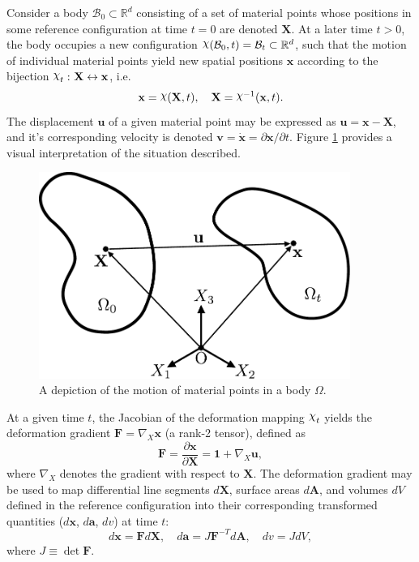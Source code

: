 Consider a body $\mathcal{B}_0 \subset \mathbb{R}^d$ consisting of a set of material points whose positions in some reference configuration at time $t = 0$ are denoted $\mathbf{X}$. At a later time $t > 0$, the body occupies a new configuration $\raisebox{\depth}{$\chi$} (\mathcal{B}_0, t) = \mathcal{B}_t \subset \mathbb{R}^d$, such that the motion of individual material points yield new spatial positions $\mathbf{x}$ according to the bijection $\raisebox{\depth}{$\chi$}_t \, \colon \mathbf{X} \leftrightarrow \mathbf{x}$, i.e.
\begin{equation}
  \mathbf{x} = \raisebox{\depth}{$\chi$} (\mathbf{X}, t), \quad \mathbf{X} = \raisebox{\depth}{$\chi$}^{-1} (\mathbf{x}, t).
\end{equation}
The displacement $\mathbf{u}$ of a given material point may be expressed as $\mathbf{u} = \mathbf{x} - \mathbf{X}$, and it's corresponding velocity is denoted $\mathbf{v} = \dot{\mathbf{x}} = \partial \mathbf{x} / \partial t$. Figure \ref{fig:kinematics} provides a visual interpretation of the situation described.
\begin{figure}[!h]
  \centering
  \includegraphics[width=4.0in]{figures/kinematics.pdf}
  \caption{A depiction of the motion of material points in a body $\Omega$.}
  \label{fig:kinematics}
\end{figure}

At a given time $t$, the Jacobian of the deformation mapping $\raisebox{\depth}{$\chi$}_t$ yields the deformation gradient $\mathbf{F} = \nabla_X \mathbf{x}$ (a rank-2 tensor), defined as
\begin{equation}
  \mathbf{F} = \frac{\partial \mathbf{x}}{\partial \mathbf{X}} = \mathbf{1} + \nabla_X \mathbf{u},
\end{equation}
where $\nabla_X$ denotes the gradient with respect to $\mathbf{X}$. The deformation gradient may be used to map differential line segments $d \mathbf{X}$, surface areas $d \mathbf{A}$, and volumes $d V$ defined in the reference configuration into their corresponding transformed quantities ($d \mathbf{x}$, $d \mathbf{a}$, $dv$) at time $t$:
\begin{equation}
  d \mathbf{x} = \mathbf{F} d \mathbf{X}, \quad d \mathbf{a} = J \mathbf{F}^{-T} d \mathbf{A}, \quad d v = J d V,
\end{equation}
where $J \equiv \det{\mathbf{F}}$.

